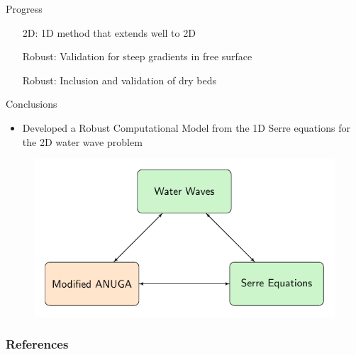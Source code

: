 \documentclass[]{beamer}
\begin{document}
\begin{frame}{Progress}
	\begin{itemize}
		\item[2D:] 1D method that extends well to 2D \checkmark
		\item[Robust:] Validation for steep gradients in free surface \checkmark
		\item[Robust:] Inclusion and validation of dry beds \checkmark
	\end{itemize}	
\end{frame}

\begin{frame}{Conclusions}
	\begin{itemize}
		\item Developed a Robust Computational Model from the 1D Serre equations for the 2D water wave problem
	\end{itemize}
	\begin{figure}
		\includegraphics[width=\textwidth]{./Pics/ModelDiagrams/FlowChartSerre12G3O.pdf}
	\end{figure}
\end{frame}


\begin{frame}[allowframebreaks]
	\frametitle{References}
	
	
\end{frame}
\end{document}
